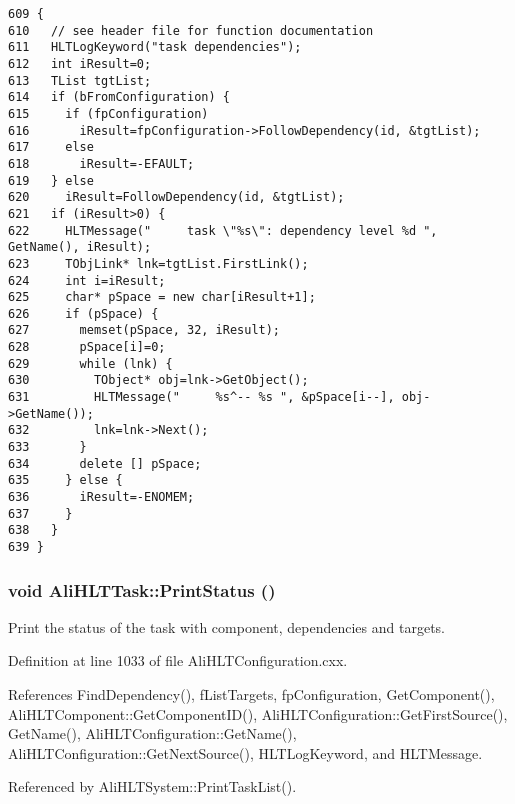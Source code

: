 \footnotesize\begin{verbatim}609 {
610   // see header file for function documentation
611   HLTLogKeyword("task dependencies");
612   int iResult=0;
613   TList tgtList;
614   if (bFromConfiguration) {
615     if (fpConfiguration)
616       iResult=fpConfiguration->FollowDependency(id, &tgtList);
617     else
618       iResult=-EFAULT;
619   } else
620     iResult=FollowDependency(id, &tgtList);
621   if (iResult>0) {
622     HLTMessage("     task \"%s\": dependency level %d ", GetName(), iResult);
623     TObjLink* lnk=tgtList.FirstLink();
624     int i=iResult;
625     char* pSpace = new char[iResult+1];
626     if (pSpace) {
627       memset(pSpace, 32, iResult);
628       pSpace[i]=0;
629       while (lnk) {
630         TObject* obj=lnk->GetObject();
631         HLTMessage("     %s^-- %s ", &pSpace[i--], obj->GetName());
632         lnk=lnk->Next();
633       }
634       delete [] pSpace;
635     } else {
636       iResult=-ENOMEM;
637     }
638   }
639 }
\end{verbatim}\normalsize 


\subsubsection{\setlength{\rightskip}{0pt plus 5cm}void Ali\-HLTTask::Print\-Status ()}\label{classAliHLTTask_a25}


Print the status of the task with component, dependencies and targets. 

Definition at line 1033 of file Ali\-HLTConfiguration.cxx.

References Find\-Dependency(), f\-List\-Targets, fp\-Configuration, Get\-Component(), Ali\-HLTComponent::Get\-Component\-ID(), Ali\-HLTConfiguration::Get\-First\-Source(), Get\-Name(), Ali\-HLTConfiguration::Get\-Name(), Ali\-HLTConfiguration::Get\-Next\-Source(), HLTLog\-Keyword, and HLTMessage.

Referenced by Ali\-HLTSystem::Print\-Task\-List().

